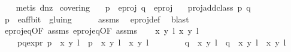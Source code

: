 \begin{isabellebody}
\ \ \isamarkupfalse%
\ {\isacharparenleft}metis\ d{\isacharunderscore}nz{\isacharparenright}%
\endisatagproof
{\isafoldproof}%
%
\isadelimproof
\isanewline
%
\endisadelimproof
\isanewline
{}\isamarkupfalse%
\ covering{\isacharcolon}\isanewline
\ \ \ {\isachardoublequoteopen}p\ {\isasymin}\ e{\isacharunderscore}proj{\isachardoublequoteclose}\ {\isachardoublequoteopen}q\ {\isasymin}\ e{\isacharunderscore}proj{\isachardoublequoteclose}\isanewline
\ \ \ {\isachardoublequoteopen}proj{\isacharunderscore}add{\isacharunderscore}class\ p\ q\ {\isasymnoteq}\ {\isacharbraceleft}{\isacharbraceright}{\isachardoublequoteclose}\isanewline
%
\isadelimproof
%
\endisadelimproof
%
\isatagproof
{}\isamarkupfalse%
\ {\isacharminus}\isanewline
\ \ \isamarkupfalse%
\ {\isachardoublequoteopen}p\ {\isasymin}\ e{\isacharunderscore}aff{\isacharunderscore}bit\ {\isacharslash}{\isacharslash}\ gluing{\isachardoublequoteclose}\isanewline
\ \ \ \ \isamarkupfalse%
\ assms{\isacharparenleft}{}{\isacharparenright}\ \isamarkupfalse%
\ e{\isacharunderscore}proj{\isacharunderscore}def\ \isamarkupfalse%
\ blast\isanewline
\ \ \isamarkupfalse%
\ e{\isacharunderscore}proj{\isacharunderscore}eq{\isacharbrackleft}OF\ assms{\isacharparenleft}{}{\isacharparenright}{\isacharbrackright}\ e{\isacharunderscore}proj{\isacharunderscore}eq{\isacharbrackleft}OF\ assms{\isacharparenleft}{}{\isacharparenright}{\isacharbrackright}\isanewline
\ \ \isamarkupfalse%
\ x\ y\ l\ x{\isacharprime}\ y{\isacharprime}\ l{\isacharprime}\ \ \isanewline
\ \ \ \ p{\isacharunderscore}q{\isacharunderscore}expr{\isacharcolon}\ {\isachardoublequoteopen}p\ {\isacharequal}\ {\isacharbraceleft}{\isacharparenleft}{\isacharparenleft}x{\isacharcomma}\ y{\isacharparenright}{\isacharcomma}\ l{\isacharparenright}{\isacharbraceright}\ {\isasymor}\ p\ {\isacharequal}\ {\isacharbraceleft}{\isacharparenleft}{\isacharparenleft}x{\isacharcomma}\ y{\isacharparenright}{\isacharcomma}\ l{\isacharparenright}{\isacharcomma}\ {\isacharparenleft}{\isasymtau}\ {\isacharparenleft}x{\isacharcomma}\ y{\isacharparenright}{\isacharcomma}\ l\ {\isacharplus}\ {}{\isacharparenright}{\isacharbraceright}\ {\isachardoublequoteclose}\ \isanewline
\ \ \ \ {\isachardoublequoteopen}q\ {\isacharequal}\ {\isacharbraceleft}{\isacharparenleft}{\isacharparenleft}x{\isacharprime}{\isacharcomma}\ y{\isacharprime}{\isacharparenright}{\isacharcomma}\ l{\isacharprime}{\isacharparenright}{\isacharbraceright}\ {\isasymor}\ q\ {\isacharequal}\ {\isacharbraceleft}{\isacharparenleft}{\isacharparenleft}x{\isacharprime}{\isacharcomma}\ y{\isacharprime}{\isacharparenright}{\isacharcomma}\ l{\isacharprime}{\isacharparenright}{\isacharcomma}\ {\isacharparenleft}{\isasymtau}\ {\isacharparenleft}x{\isacharprime}{\isacharcomma}\ y{\isacharprime}{\isacharparenright}{\isacharcomma}\ l{\isacharprime}\ {\isacharplus}\ {}{\isacharparenright}{\isacharbraceright}{\isachardoublequoteclose}\isanewline

\end{isabellebody}

